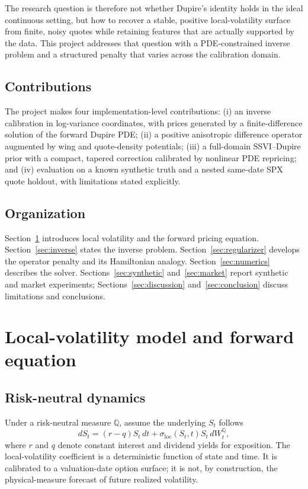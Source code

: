 \documentclass[11pt,a4paper]{article}
\begin{document}
The research question is therefore not whether Dupire's identity holds in the ideal continuous setting, but how to recover a stable, positive local-volatility surface from finite, noisy quotes while retaining features that are actually supported by the data. This project addresses that question with a PDE-constrained inverse problem and a structured penalty that varies across the calibration domain.

\subsection{Contributions}
The project makes four implementation-level contributions: (i) an inverse calibration in log-variance coordinates, with prices generated by a finite-difference solution of the forward Dupire PDE; (ii) a positive anisotropic difference operator augmented by wing and quote-density potentials; (iii) a full-domain SSVI--Dupire prior with a compact, tapered correction calibrated by nonlinear PDE repricing; and (iv) evaluation on a known synthetic truth and a nested same-date SPX quote holdout, with limitations stated explicitly.

\subsection{Organization}
Section~\ref{sec:background} introduces local volatility and the forward pricing equation. Section~\ref{sec:inverse} states the inverse problem. Section~\ref{sec:regularizer} develops the operator penalty and its Hamiltonian analogy. Section~\ref{sec:numerics} describes the solver. Sections~\ref{sec:synthetic} and~\ref{sec:market} report synthetic and market experiments; Sections~\ref{sec:discussion} and~\ref{sec:conclusion} discuss limitations and conclusions.

\section{Local-volatility model and forward equation}\label{sec:background}
\subsection{Risk-neutral dynamics}
Under a risk-neutral measure $\mathbb{Q}$, assume the underlying $S_t$ follows
\begin{equation}\label{eq:sde}
  dS_t=(r-q)S_t\,dt+\sigma_{\mathrm{loc}}(S_t,t)S_t\,dW_t^{\mathbb Q},
\end{equation}
where $r$ and $q$ denote constant interest and dividend yields for exposition. The local-volatility coefficient is a deterministic function of state and time. It is calibrated to a valuation-date option surface; it is not, by construction, the physical-measure forecast of future realized volatility.
\end{document}
